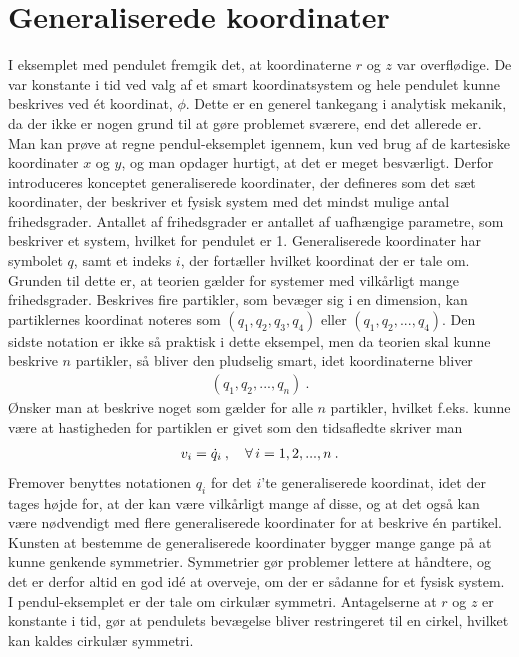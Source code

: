 \section{Generaliserede koordinater}
I eksemplet med pendulet fremgik det, at koordinaterne $r$ og $z$ var overflødige. De var konstante i tid ved valg af et smart koordinatsystem og hele pendulet kunne beskrives ved ét koordinat, $\phi$. Dette er en generel tankegang i analytisk mekanik, da der ikke er nogen grund til at gøre problemet sværere, end det allerede er. Man kan prøve at regne pendul-eksemplet igennem, kun ved brug af de kartesiske koordinater $x$ og $y$, og man opdager hurtigt, at det er meget besværligt. Derfor introduceres konceptet generaliserede koordinater, der defineres som det sæt koordinater, der beskriver et fysisk system med det mindst mulige antal frihedsgrader. Antallet af frihedsgrader er antallet af uafhængige parametre, som beskriver et system, hvilket for pendulet er 1. Generaliserede koordinater har symbolet $q$, samt et indeks $i$, der fortæller hvilket koordinat der er tale om. Grunden til dette er, at teorien gælder for systemer med vilkårligt mange frihedsgrader. Beskrives fire partikler, som bevæger sig i en dimension, kan partiklernes koordinat noteres som $(q_1,q_2,q_3,q_4)$ eller $(q_1,q_2,...,q_4)$. Den sidste notation er ikke så praktisk i dette eksempel, men da teorien skal kunne beskrive $n$ partikler, så bliver den pludselig smart, idet koordinaterne bliver
%
\begin{align}
	(q_1,q_2,...,q_n) \: .
\end{align}
%
Ønsker man at beskrive noget som gælder for alle $n$ partikler, hvilket f.eks. kunne være at hastigheden for partiklen er givet som den tidsafledte skriver man
\begin{align}
	v_i = \dot{q}_i \: , \quad \forall \, i=1,2,...,n \: .
\end{align}
Fremover benyttes notationen $q_i$ for det $i$'te generaliserede koordinat, idet der tages højde for, at der kan være vilkårligt mange af disse, og at det også kan være nødvendigt med flere generaliserede koordinater for at beskrive én partikel. \\

Kunsten at bestemme de generaliserede koordinater bygger mange gange på at kunne genkende symmetrier. Symmetrier gør problemer lettere at håndtere, og det er derfor altid en god idé at overveje, om der er sådanne for et fysisk system. I pendul-eksemplet er der tale om cirkulær symmetri. Antagelserne at $r$ og $z$ er konstante i tid, gør at pendulets bevægelse bliver restringeret til en cirkel, hvilket kan kaldes cirkulær symmetri.

